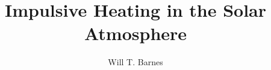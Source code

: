 \documentclass[12pt]{ruthesis}
\title{Impulsive Heating in the Solar Atmosphere}
\author{Will T. Barnes}
\begin{document}
  \begin{frontmatter}
   \maketitle
   
   \tableofcontents
   \listoffigures
   \listoftables
%   
  \end{frontmatter}









\appendix

%
%
%
%



\end{document}

